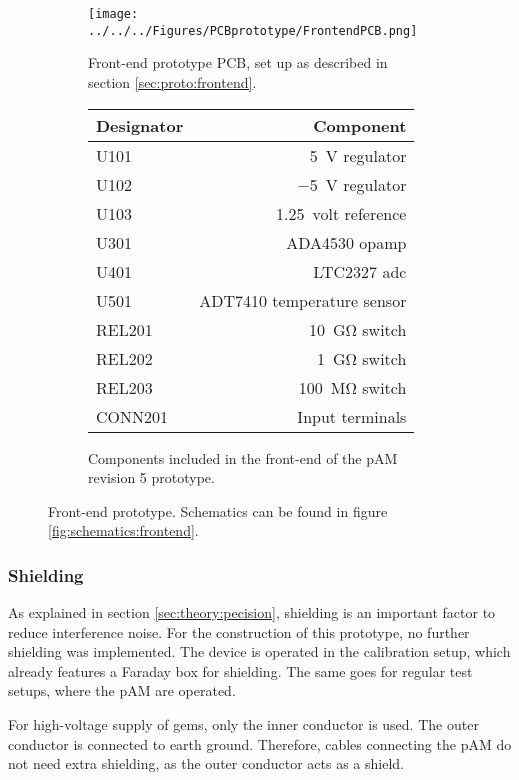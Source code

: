 \begin{figure}
	\begin{subfigure}{0.6\textwidth}
		\texttt{[image: ../../../Figures/PCBprototype/FrontendPCB.png]}
		\caption{Front-end prototype PCB, set up as described in section \ref{sec:proto:frontend}.}
	\end{subfigure}
	\begin{subfigure}{0.39\textwidth}
	\begin{tabular}{lr}
		\hline
		Designator & Component \\\hline
		U101 & \SI{5}{\volt} regulator \\
		U102 & \SI{-5}{\volt} regulator \\
		U103 & \SI{1.25}{volt} reference\\
		U301 & ADA4530 \ac{opamp}\\
		U401 & LTC2327 \ac{adc}\\
		U501 & ADT7410 temperature sensor\\
		REL201 & \SI{10}{\giga\ohm} switch\\
		REL202 & \SI{1}{\giga\ohm} switch\\
		REL203 & \SI{100}{\mega\ohm} switch\\
		CONN201 & Input terminals\\\hline 	
	\end{tabular}	%
	\caption{Components included in the front-end of the \ac{pAM} revision 5 prototype.}
	\end{subfigure}
	\caption{Front-end prototype. Schematics can be found in figure \ref{fig:schematics:frontend}.}
	\label{fig:pcb:frontend}
\end{figure}
\subsubsection*{Shielding}
As explained in section \ref{sec:theory:pecision}, shielding is an important factor to reduce interference noise. For the construction of this prototype, no further shielding was implemented.
The device is operated in the calibration setup, which already features a Faraday box for shielding. The same goes for regular test setups, where the \ac{pAM} are operated.

For high-voltage supply of \acp{gem}, only the inner conductor is used. The outer conductor is connected to earth ground. Therefore, cables connecting the \ac{pAM} do not need extra shielding, as the outer conductor acts as a shield. 
